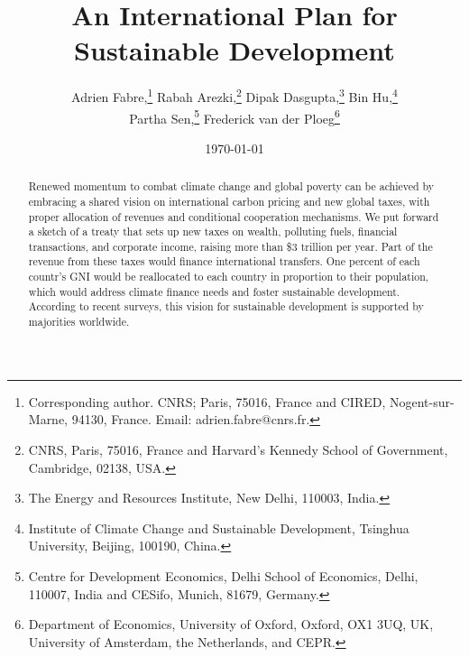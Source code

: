 \documentclass[12pt,english]{article}
\title{An International Plan for Sustainable Development
}
\author{Adrien Fabre,\footnote{Corresponding author. CNRS; Paris, 75016, France and CIRED, Nogent-sur-Marne, 94130, France. Email: adrien.fabre@cnrs.fr.} \;
Rabah Arezki,\footnote{CNRS, Paris, 75016, France and Harvard’s Kennedy School of Government, Cambridge, 02138, USA.} \;
Dipak Dasgupta,\footnote{The Energy and Resources Institute, New Delhi, 110003, India.} \;
Bin Hu,\footnote{Institute of Climate Change and Sustainable Development, Tsinghua University, Beijing, 100190, China.}  \\
Partha Sen,\footnote{Centre for Development Economics, Delhi School of Economics, Delhi, 110007, India and CESifo, Munich, 81679, Germany.}  \;
Frederick van der Ploeg\footnote{Department of Economics, University of Oxford, Oxford, OX1 3UQ, UK, University of Amsterdam, the Netherlands, and CEPR.} }
\date{\today{} %
}
\begin{document}
\maketitle

\begin{abstract}
  Renewed momentum to combat climate change and global poverty can be achieved by embracing a shared vision on international carbon pricing and new global taxes, with proper allocation of revenues and conditional cooperation mechanisms. We put forward a sketch of a treaty that sets up new taxes on wealth, polluting fuels, financial transactions, and corporate income, raising more than \$3 trillion per year. Part of the revenue from these taxes would finance international transfers. One percent of each countr's GNI would be reallocated to each country in proportion to their population, which would address climate finance needs and foster sustainable development. According to recent surveys, this vision for sustainable development is supported by majorities worldwide.
\end{abstract}
\end{document}
